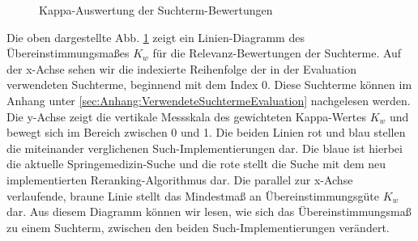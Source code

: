 
\begin{figure}[H]
\centering 
\vspace{-1.5em}
\caption[Kappa-Auswertung der Suchterm-Bewertungen]{Kappa-Auswertung der Suchterm-Bewertungen}
\label{fig:Evaluation:Auswertung:Kappas}

\footnotesize
{}\kappas
\pgfsetplotmarksize{.5pt}
  

\vspace{-2.5em}
\end{figure}

Die oben dargestellte Abb. \ref{fig:Evaluation:Auswertung:Kappas} zeigt ein Linien-Diagramm des Übereinstimmungsmaßes $K_w$ für die Relevanz-Bewertungen der Suchterme. Auf der x-Achse sehen wir die indexierte Reihenfolge der in der Evaluation verwendeten Suchterme, beginnend mit dem Index 0. Diese Suchterme können im Anhang unter \ref{sec:Anhang:VerwendeteSuchtermeEvaluation} nachgelesen werden. Die y-Achse zeigt die vertikale Messskala des gewichteten Kappa-Wertes $K_w$ und bewegt sich im Bereich zwischen 0 und 1. Die beiden Linien rot und blau stellen die miteinander verglichenen Such-Implementierungen dar. Die blaue ist hierbei die aktuelle Springemedizin-Suche und die rote stellt die Suche mit dem neu implementierten Reranking-Algorithmus dar. Die parallel zur x-Achse verlaufende, braune Linie stellt das Mindestmaß an Übereinstimmungsgüte $K_w$ dar. Aus diesem Diagramm können wir lesen, wie sich das Übereinstimmungsmaß zu einem Suchterm, zwischen den beiden Such-Implementierungen verändert. 


